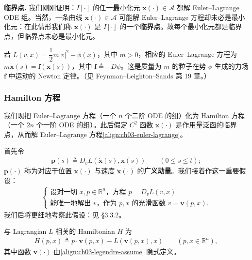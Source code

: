 \documentclass[../../main.tex]{subfiles}
\begin{document}
\textbf{临界点.} 我们刚刚证明：$I[\cdot]$ 的任一最小化元 $\mathbf{x}(\cdot)\in\mathcal{A}$ 都解 Euler--Lagrange ODE 组。当然，一条曲线 $\mathbf{x}(\cdot)\in\mathcal{A}$ 可能解 Euler--Lagrange 方程却未必是最小化元：在此情形我们称 $\mathbf{x}(\cdot)$ 是 $I[\cdot]$ 的一个\textbf{临界点}。故每个最小化元都是临界点，但临界点未必是最小化元。

\begin{example}\label{example:ch03-newton}
若 $L(v,x)=\dfrac{1}{2}m|v|^2-\phi(x)$，其中 $m>0$，相应的 Euler--Lagrange 方程为 $m\ddot{\mathbf{x}}(s)=\mathbf{f}(\mathbf{x}(s))$，其中 $\mathbf{f}\triangleq-D\phi$。这是质量为 $m$ 的粒子在势 $\phi$ 生成的力场 $\mathbf{f}$ 中运动的 Newton 定律。（见 Feynman--Leighton--Sands \cite{F-L-S} 第 19 章。）
\end{example}

\subsubsection{Hamilton 方程}

我们现把 Euler--Lagrange 方程（一个 $n$ 个二阶 ODE 的组）化为 Hamilton 方程（一个 $2n$ 个一阶 ODE 的组）。此后假定 $C^2$ 函数 $\mathbf{x}(\cdot)$ 是作用量泛函的临界点，从而解 Euler--Lagrange 方程\eqref{align:ch03-euler-lagrange}。

首先令
\begin{align}\label{align:ch03-momentum}
\mathbf{p}(s)\triangleq D_v L(\dot{\mathbf{x}}(s),\mathbf{x}(s)) \qquad (0\leqslant s\leqslant t);
\end{align}
$\mathbf{p}(\cdot)$ 称为对应于位置 $\mathbf{x}(\cdot)$ 与速度 $\dot{\mathbf{x}}(\cdot)$ 的\textbf{广义动量}。我们接着作这一重要假设：
\begin{align}\label{align:ch03-legendre-assume}
\begin{cases}
\text{设对一切 }x,p\in\mathbb{R}^n\text{，方程 }p=D_v L(v,x)\\
\text{能唯一地解出 }v\text{，作为 }p,x\text{ 的光滑函数 }v=\mathbf{v}(p,x).
\end{cases}
\end{align}
我们后将更细地考察此假设：见 \S3.3.2。

\begin{definition}\label{definition:ch03-hamiltonian}
与 Lagrangian $L$ 相关的 Hamiltonian $H$ 为
\begin{align}\label{align:ch03-hamiltonian-def}
H(p,x)\triangleq p\cdot\mathbf{v}(p,x)-L(\mathbf{v}(p,x),x) \qquad (p,x\in\mathbb{R}^n),
\end{align}
其中函数 $\mathbf{v}(\cdot)$ 由\eqref{align:ch03-legendre-assume} 隐式定义。
\end{definition}
\end{document}
